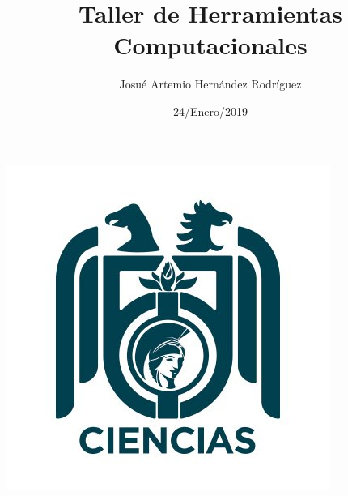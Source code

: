 \documentclass[letterpaper, 12pt,oneside]{article}
\title{\Huge Taller de Herramientas Computacionales}
\author{Josué Artemio Hernández Rodríguez}
\date{24/Enero/2019}
\begin{document}
	\maketitle
	\begin{center}
		\includegraphics[scale=0.7]{3.jpg}
	\end{center}

	\newpage
	
	\title{\huge \textit{ }}\\
	
\end{document}
